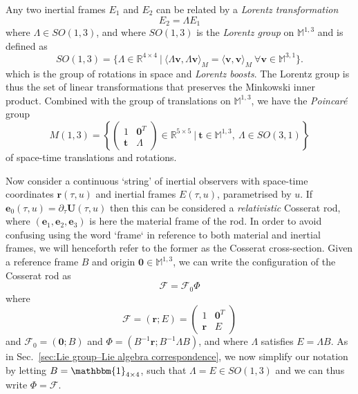 Any two inertial frames $E_1$ and $E_2$ can be related by a \textit{Lorentz transformation}
\begin{equation} \label{eq:E1 E2 lorentz relation}
E_2 = \Lambda E_1
\end{equation}
where $\Lambda \in SO(1, 3)$, and where $SO(1, 3)$ is the \textit{Lorentz group} on $\mathbb{M}^{1,3}$ and is defined as
\begin{equation}
SO(1, 3) = \{ \Lambda \in \mathbb{R}^{4 \times 4} \ |\ \langle \Lambda \mathbf{v}, \Lambda \mathbf{v} \rangle_M = \langle \mathbf{v}, \mathbf{v} \rangle_M\ \forall \mathbf{v} \in \mathbb{M}^{3,1 } \}.
\end{equation}
which is the group of rotations in space and \textit{Lorentz boosts}. The Lorentz group is thus the set of linear transformations that preserves the Minkowski inner product. Combined with the group of translations on $\mathbb{M}^{1,3}$, we have the \textit{Poincaré} group
\begin{equation}
M(1,3) = \left\{
\begin{pmatrix}
1 & \mathbf{0}^T \\
\mathbf{t} & \Lambda
\end{pmatrix} \in \mathbb{R}^{5 \times 5}\ |\ \mathbf{t} \in \mathbb{M}^{1,3},\ \Lambda \in SO(3,1) 
\right\}
\end{equation}
of space-time translations and rotations.

Now consider a continuous `string' of inertial observers with space-time coordinates $\mathbf{r}(\tau, u)$ and inertial frames $E(\tau, u)$, parametrised by $u$. If $\mathbf{e}_0(\tau, u) = \partial_\tau \mathbf{U}(\tau, u)$ then this can be considered a \textit{relativistic} Cosserat rod, where $(\mathbf{e}_1, \mathbf{e}_2, \mathbf{e}_3)$ is here the material frame of the rod. In order to avoid confusing using the word `frame` in reference to both material and inertial frames, we will henceforth refer to the former as the Cosserat cross-section. Given a reference frame $B$ and origin $\mathbf{0} \in \mathbb{M}^{1,3}$, we can write the configuration of the Cosserat rod as
\begin{equation}
\mathcal{F} = \mathcal{F}_0 \Phi
\end{equation}
where
\begin{equation}
\mathcal{F} = (\mathbf{r} ; E ) = \begin{pmatrix}
1 & \mathbf{0}^T \\
\mathbf{r} & E
\end{pmatrix}
\end{equation}
and $\mathcal{F}_0 = (\mathbf{0} ; B)$ and $\Phi = (B^{-1} \mathbf{r} ; B^{-1} \Lambda B)$, and where $\Lambda$ satisfies $E = \Lambda B$. As in Sec.~\ref{sec:Lie group–Lie algebra correspondence}, we now simplify our notation by letting $B = \mathbbm{1}_{4 \times 4}$, such that $\Lambda = E \in SO(1,3)$ and we can thus write $\Phi = \mathcal{F}$. 

